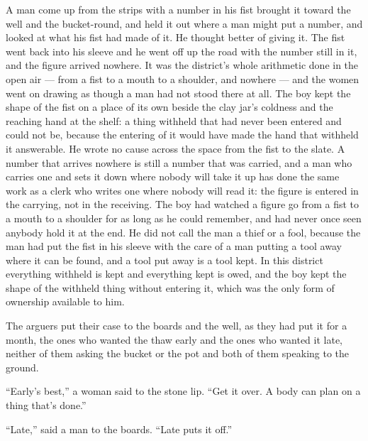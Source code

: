 A man come up from the strips with a number in his fist brought it toward the well and the bucket-round, and held it out where a man might put a number, and looked at what his fist had made of it. He thought better of giving it. The fist went back into his sleeve and he went off up the road with the number still in it, and the figure arrived nowhere. It was the district's whole arithmetic done in the open air --- from a fist to a mouth to a shoulder, and nowhere --- and the women went on drawing as though a man had not stood there at all. The boy kept the shape of the fist on a place of its own beside the clay jar's coldness and the reaching hand at the shelf: a thing withheld that had never been entered and could not be, because the entering of it would have made the hand that withheld it answerable. He wrote no cause across the space from the fist to the slate. A number that arrives nowhere is still a number that was carried, and a man who carries one and sets it down where nobody will take it up has done the same work as a clerk who writes one where nobody will read it: the figure is entered in the carrying, not in the receiving. The boy had watched a figure go from a fist to a mouth to a shoulder for as long as he could remember, and had never once seen anybody hold it at the end. He did not call the man a thief or a fool, because the man had put the fist in his sleeve with the care of a man putting a tool away where it can be found, and a tool put away is a tool kept. In this district everything withheld is kept and everything kept is owed, and the boy kept the shape of the withheld thing without entering it, which was the only form of ownership available to him.

The arguers put their case to the boards and the well, as they had put it for a month, the ones who wanted the thaw early and the ones who wanted it late, neither of them asking the bucket or the pot and both of them speaking to the ground.

“Early's best,” a woman said to the stone lip. “Get it over. A body can plan on a thing that's done.”

“Late,” said a man to the boards. “Late puts it off.”

